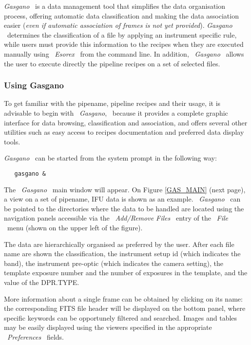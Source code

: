 {\it Gasgano} \ is a data management tool that simplifies the data 
organisation process, offering automatic data classification and making
the data association easier ({\it even if automatic association of frames is 
not yet provided}). {\it Gasgano} \ determines the classification of a file
by applying an instrument specific rule, while users must provide this
information to the recipes when they are executed manually using
\ {\it Esorex} \ from the command line. In addition, 
\ {\it Gasgano} \ allows the user to execute 
directly the pipeline recipes on a set of selected files. 

\subsubsection{Using Gasgano}
\label{GASGANO}
 
To get familiar with the pipename, pipeline recipes and their usage, it 
is advisable to begin with \ {\it Gasgano}, \ because it provides
a complete graphic interface for data browsing, classification and 
association, and offers several other utilities such as easy access 
to recipes documentation and preferred data display tools.

{\it Gasgano} \ can be started from the system prompt in the following way:

\begin{verbatim}
   gasgano &
\end{verbatim}


The \ {\it Gasgano} \ main window will appear. On Figure \ref{GAS_MAIN}
(next page), a view on a set of pipename, IFU data is shown as an 
example. \ {\it Gasgano} \ can 
be pointed to the directories where the data to be handled are located
using the navigation panels accessible via the \ {\it Add/Remove Files} \
entry of the \ {\it File} \ menu (shown on the upper left of the figure). 

The data are hierarchically organised as preferred by the user.
After each file name are shown the classification, 
the instrument setup id (which indicates the band), the instrument 
pre-optic (which indicates the camera setting), the template exposure 
number and the number of exposures in the template, and the value 
of the DPR.TYPE. 

More information about a single frame
can be obtained by clicking on its name: the corresponding
FITS file header will be displayed on the bottom panel, where
specific keywords can be opportunely filtered and searched.
Images and tables may be easily displayed using the 
viewers specified in the appropriate \ {\it Preferences} \ fields.

